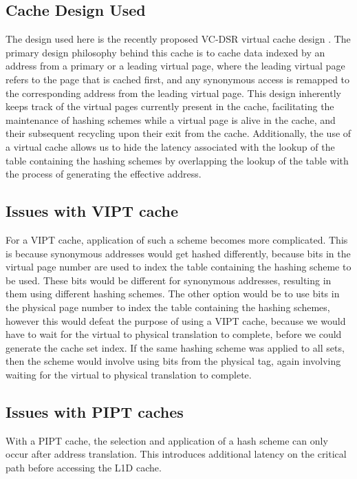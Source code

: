 \subsection{Cache Design Used}
The design used here is the recently proposed VC-DSR virtual cache design \cite{yoon2016revisiting}. The primary design philosophy behind this cache is to cache data indexed by an address from a primary or a leading virtual page, where the leading virtual page refers to the page that is cached first, and any synonymous access is remapped to the corresponding address from the leading virtual page.  This design inherently keeps track of the virtual pages currently present in the cache, facilitating the maintenance of hashing schemes while a virtual page is alive in the cache, and their subsequent recycling upon their exit from the cache. Additionally, the use of a virtual cache allows us to hide the latency associated with the lookup of the table containing the hashing schemes by overlapping the lookup of the table with the process of generating the effective address. 

\subsection{Issues with VIPT cache}
For a VIPT cache, application of such a scheme becomes more complicated. This is because synonymous addresses would get hashed differently, because bits in the virtual page number are used to index the table containing the hashing scheme to be used. These bits would be different for synonymous addresses, resulting in them using different hashing schemes. The other option would be to use bits in the physical page number to index the table containing the hashing schemes, however this would defeat the purpose of using a VIPT cache, because we would have to wait for the virtual to physical translation to complete, before we could generate the cache set index. If the same hashing scheme was applied to all sets, then the scheme would involve using bits from the physical tag, again involving waiting for the virtual to physical translation to complete. 

\subsection{Issues with PIPT caches}
With a PIPT cache, the selection and application of a hash scheme can only occur after address translation. This introduces additional latency on the critical path before accessing the L1D cache. 


